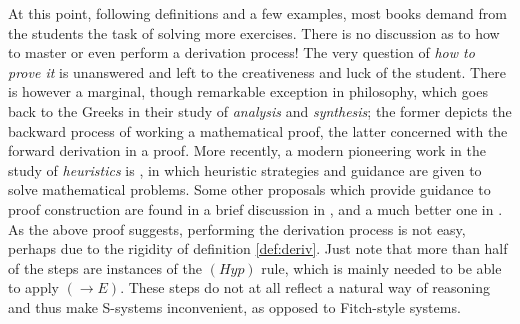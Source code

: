 \documentclass[a4paper,UKenglish]{lipics}
\begin{document}
At this point, following definitions and a few examples, most books demand from the students the task of solving more exercises. There is
no discussion as to how to master or even perform a derivation process! The very question of {\em how to prove it} is unanswered and left to the
creativeness and luck of the student. There is however a marginal, though remarkable exception in philosophy, which goes back to the
Greeks in their study of {\em analysis} and {\em synthesis}; the former depicts the backward process of working a mathematical proof, the latter concerned
with the forward derivation in a proof. More recently, a modern pioneering work in the study of {\em heuristics} is \cite{polya}, in which heuristic
strategies and guidance are given to solve mathematical problems. Some other 
proposals which provide guidance to proof construction are found in a brief discussion in \cite{hr}, and a much better one in \cite{mh}.  \\

As the above proof suggests, performing the derivation process is not easy, perhaps due to the rigidity of definition \ref{def:deriv}. Just note that more than half of the steps are instances of the $(Hyp)$ rule, which is mainly needed to be able to apply $(\to E)$.
These steps do not at all reflect a natural way of reasoning and thus make S-systems inconvenient, as opposed to Fitch-style systems. \\
\end{document}
